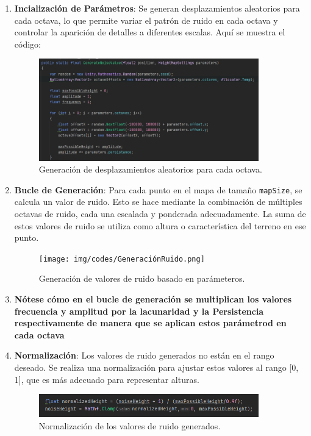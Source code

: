 \begin{enumerate}
    \item \textbf{Incialización de Parámetros}: Se generan desplazamientos aleatorios para cada octava, lo que permite variar el patrón de ruido en cada octava y controlar la aparición de detalles a diferentes escalas.
    Aquí se muestra el código:
    \begin{figure}[h]
        \centering
        \includegraphics[width=0.9\textwidth]{img/codes/octavas.png}
        \caption{Generación de desplazamientos aleatorios para cada octava.}
    \end{figure}
    
    \item \textbf{Bucle de Generación}: Para cada punto en el mapa de tamaño \texttt{mapSize}, se calcula un valor de ruido. Esto se hace mediante la combinación de múltiples octavas de ruido, cada una escalada y ponderada adecuadamente. La suma de estos valores de ruido se utiliza como altura o característica del terreno en ese punto.
    \begin{figure}[h]
        \centering
        \texttt{[image: img/codes/GeneraciónRuido.png]}
        \caption{Generación de valores de ruido basado en parámeteros.}
    \end{figure}
    \item \textbf{Nótese cómo en el bucle de generación se multiplican los valores frecuencia y amplitud por la lacunaridad y la Persistencia respectivamente de manera que se aplican estos parámetrod en cada octava}
    \item \textbf{Normalización}: Los valores de ruido generados no están en el rango deseado. Se realiza una normalización para ajustar estos valores al rango [0, 1], que es más adecuado para representar alturas.
    \begin{figure}[h]
        \centering
        \includegraphics[width=0.9\textwidth]{img/codes/normalizacion.png}
        \caption{Normalización de los valores de ruido generados.}
    \end{figure}
\end{enumerate}


